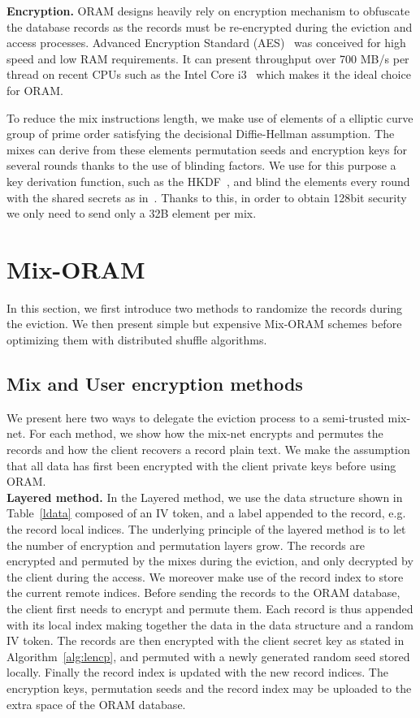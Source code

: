 \documentclass[USenglish,oneside,twocolumn]{article}
\begin{document}
\noindent\textbf{Encryption.}
ORAM designs heavily rely on encryption mechanism to obfuscate the database records as the records must be re-encrypted during the eviction and access processes.
Advanced Encryption Standard (AES)~\cite{daemen2013design} was conceived for high speed and low RAM requirements. It can present throughput over 700 MB/s per thread on recent CPUs such as the Intel Core i3~\cite{mcwilliams2014hardware} which makes it the ideal choice for ORAM.

To reduce the mix instructions length, we make use of elements of a elliptic curve group of prime order satisfying the decisional Diffie-Hellman assumption. The mixes can derive from these elements permutation seeds and encryption keys for several rounds thanks to the use of blinding factors. We use for this purpose a key derivation function, such as the HKDF~\cite{krawczyk2010cryptographic}, and blind the elements every round with the shared secrets as in~\cite{danezis2009sphinx}. Thanks to this, in order to obtain 128bit security we only need to send only a 32B element per mix.
%
\section{Mix-ORAM}\label{Mix-ORAM}
In this section, we first introduce two methods to randomize the records during the eviction. We then present simple but expensive Mix-ORAM schemes before optimizing them with distributed shuffle algorithms. 
%
\subsection{Mix and User encryption methods}\label{Enc}
We present here two ways to delegate the eviction process to a semi-trusted mix-net. For each method, we show how the mix-net encrypts and permutes the records and how the client recovers a record plain text.
We make the assumption that all data has first been encrypted with the client private keys  before using ORAM. \\

\noindent\textbf{Layered method.} In the Layered method, we use the data structure shown in Table~\ref{ldata} composed of an IV token, and a label appended to the record, e.g. the record local indices. The underlying principle of the layered method is to let the number of encryption and permutation layers grow. The records are encrypted and permuted by the mixes during the eviction, and only decrypted by the client during the access. We moreover make use of the record index to store the current remote indices. %
Before sending the records to the ORAM database, the client first needs to encrypt and permute them. Each record is thus appended with its local index making together the data in the data structure and a random IV token. The records are then encrypted with the client secret key as stated in Algorithm~\ref{alg:lencp}, and permuted with a newly generated random seed stored locally. Finally the record index is updated with the new record indices. The encryption keys, permutation seeds and the record index may be uploaded to the extra space of the ORAM database.\\
\end{document}
